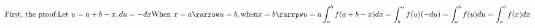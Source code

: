 \documentclass[preview]{standalone}
\begin{document}
\begin{align*}
\text{First, the proof:} \text{Let } u = a + b - x, du = -dx \text{When } x = a \rarrow u = b, \text{when} x = b \rarrpw u = a \int_a^b f(a+b-x)dx = \int_b^a f(u)(-du) = \int_a^b f(u) du = \int_a^b f(x) dx
\end{align*}
\end{document}
